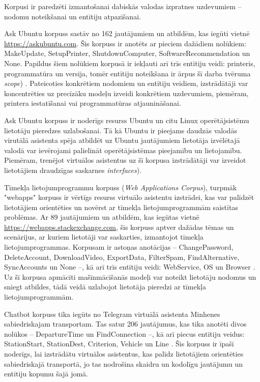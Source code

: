 Korpusi ir paredzēti izmantošanai dabiskās valodas izpratnes uzdevumiem -- nodomu noteikšanai un entītiju atpazīšanai.

Ask Ubuntu korpuss sastāv no 162 jautājumiem un atbildēm, kas iegūti vietnē \url{https://askubuntu.com}. Šis korpuss ir anotēts ar pieciem dažādiem nolūkiem: MakeUpdate, SetupPrinter, ShutdownComputer, SoftwareRecommendation un None. Papildus šiem nolūkiem korpusā ir iekļauti arī trīs entītiju veidi: printeris, programmatūra un versija, tomēr entītiju noteikšana ir ārpus šī darba tvēruma \textit{scope}) \cite{braun-2017}. Pateicoties konkrētiem nodomiem un entītiju veidiem, izstrādātāji var koncentrēties uz precīzāku modeļu izveidi konkrētiem uzdevumiem, piemēram, printera iestatīšanai vai programmatūras atjaunināšanai.

Ask Ubuntu korpuss ir noderīgs resurss Ubuntu un citu Linux operētājsistēmu lietotāju pieredzes uzlabošanai. Tā kā Ubuntu ir pieejams daudzās valodās virutālā asistenta spēja atbildēt uz Ubuntu jautājumiem lietotāja izvēlētajā valodā var ievērojami palielināt operētājsistēmas pieejamību un lietojamību. Piemēram, trenējot virtuālos asistentus uz šī korpusa izstrādātāji var izveidot lietotājiem draudzīgas saskarnes \textit{interfaces}). 


Tīmekļa lietojumprogrammu korpuss (\textit{Web Applications Corpus}), turpmāk "webapps" korpuss ir vērtīgs resurss virtuālo asistentu izstrādei, kas var palīdzēt lietotājiem orientēties un novērst ar tīmekļa lietojumprogrammām saistītas problēmas. Ar 89 jautājumiem un atbildēm, kas iegūtas vietnē \url{https://webapps.stackexchange.com}, šis korpuss aptver dažādas tēmas un scenārijus, ar kuriem lietotāji var saskarties, izmantojot tīmekļa lietojumprogrammas. Korpusam ir astoņas anotācijas -- ChangePassword, DeleteAccount, DownloadVideo, ExportData, FilterSpam, FindAlternative, SyncAccounts un None --, kā arī trīs entītiju veidi: WebService, OS un Browser \cite{braun-2017}. Uz šī korpusa apmācīti mašīnmācīšanās modeļi var noteikt lietotāju nodomus un sniegt atbildes, tādā veidā uzlabojot lietotāja pieredzi ar tīmekļa lietojumprogrammām.

Chatbot korpuss tika iegūts no Telegram virtuālā asistenta Minhenes sabiedriskajam transportam. Tas satur 206 jautājumus, kas tika anotēti divos nolūkos -- DepartureTime un FindConnection --, kā arī piecus entītiju veidus: StationStart, StationDest, Criterion, Vehicle un Line \cite{braun-2017}. Šis korpuss ir īpaši noderīgs, lai izstrādātu virtuālos asistentus, kas palīdz lietotājiem orientēties sabiedriskajā transportā, jo tas nodrošina skaidru un kodolīgu jautājumu un entītiju kopumu šajā jomā. 


